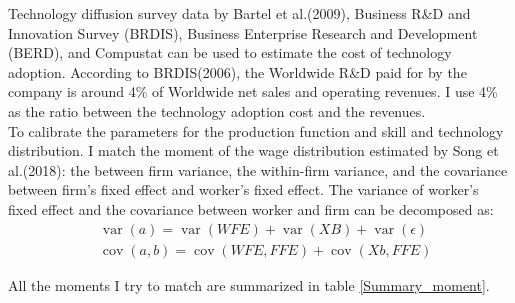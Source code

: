 \documentclass[12pt]{article}
\newcommand{\1}{\mathbb{1}}
\DeclareMathOperator{\var}{var}
\DeclareMathOperator{\cov}{cov}
\begin{document}
Technology diffusion survey data by Bartel et al.(2009)\cite{Barteletal2009}, Business R\&D and Innovation Survey (BRDIS), Business Enterprise Research and Development (BERD), and Compustat can be used to estimate the cost of technology adoption. According to BRDIS(2006), the Worldwide R\&D paid for by the company is around 4\% of Worldwide net sales and operating revenues. I use 4\% as the ratio between the technology adoption cost and the revenues.\\

To calibrate the parameters for the production function and skill and technology distribution. I match the moment of the wage distribution estimated by Song et al.(2018)\cite{Songetal2018}: the between firm variance, the within-firm variance, and the covariance between firm's fixed effect and worker's fixed effect. The variance of worker's fixed effect and the covariance between worker and firm can be decomposed as: 
\begin{align*}
& \var(a) =\var(WFE) + \var(XB) +\var(\epsilon) \\
& \cov(a,b) = \cov(WFE,FFE)+\cov(Xb,FFE)
\end{align*}

All the moments I try to match are summarized in table \ref{Summary_moment}. \\
\end{document}
